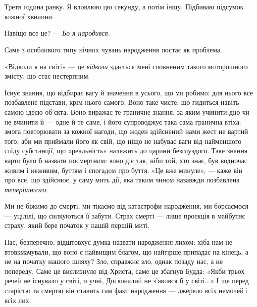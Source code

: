 \chapter{}


\begin{aphorism}
Третя година ранку. Я вловлюю цю секунду, а потім іншу. Підбиваю підсумок кожної хвилини.

\noindent Навіщо все це? — \textit{Бо я народився.}

\noindent Саме з особливого типу нічних чувань народження постає як проблема.
\end{aphorism}

\asterism

\begin{aphorism}
  «Відколи я на світі» — це \textit{відколи} здається мені сповненим такого моторошного змісту, що стає нестерпним.
\end{aphorism}

\asterism

\begin{aphorism}
Існує знання, що відбирає вагу й значення в усього, що ми робимо: для нього все позбавлене підстави, крім нього самого. Воно таке чисте, що гидиться навіть самою ідеєю
об'єкта. Воно виражає те граничне знання, за яким учинити дію чи не вчинити її — одне й те саме, і його супроводжує така сама гранична втіха: змога повторювати за кожної
нагоди, що жоден здійснений нами жест не вартий того, аби ми приймали його як свій, що ніщо не набуває ваги від найменшого сліду субстанції,
що «реальність» належить до царини безглуздого. Таке знання варто було б назвати посмертним: воно діє так, ніби той, хто знає, був водночас живим і неживим, буттям і спогадом про буття. 
«Це вже минуле», — каже він про все, що здійснює, у саму мить дії, яка таким чином назавжди позбавлена \textit{теперішнього}.
\end{aphorism}

\asterism

\begin{aphorism}
Ми не біжимо до смерті, ми тікаємо від катастрофи народження, ми борсаємося — уцілілі, що силкуються її забути. Страх смерті — лише проєкція в майбутнє страху, який
бере початок у нашій першій миті.

Нас, безперечно, відштовхує думка назвати народження лихом: хіба нам не втовкмачували, що воно є найвищим благом, що найгірше припадає на кінець, а не на початку
нашого шляху? Зло, справжнє зло, однак позаду нас, а не попереду. Саме це вислизнуло від Христа, саме це збагнув Будда: «Якби трьох речей не існувало у світі, о учні, 
Досконалий не з'явився б у світі...» І ще перед старістю та смертю він ставить сам факт народження — джерело всіх немочей і всіх лих.
\end{aphorism}

